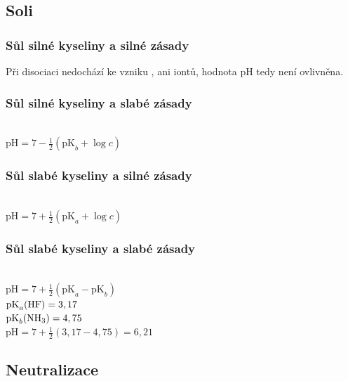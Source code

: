 \subsection{Soli}

\subsubsection{Sůl silné kyseliny a silné zásady}


Při disociaci nedochází ke vzniku , ani  iontů, hodnota pH tedy není ovlivněna.

\subsubsection{Sůl silné kyseliny a slabé zásady}
\\
$\textrm{pH} = 7 - \frac{1}{2}(\textrm{pK}_b + \log c)$ \\

\subsubsection{Sůl slabé kyseliny a silné zásady}
\\
$\textrm{pH} = 7 + \frac{1}{2}(\textrm{pK}_a + \log c)$ \\

\subsubsection{Sůl slabé kyseliny a slabé zásady}
\\
$\textrm{pH} = 7 + \frac{1}{2}(\textrm{pK}_a - \textrm{pK}_b)$\\
$\textrm{pK}_a (\ce{HF}) = 3,17$\\
$\textrm{pK}_b (\ce{NH3}) = 4,75$\\
$\textrm{pH} = 7 + \frac{1}{2}(3,17 - 4,75) = 6,21$\\

\newpage
\subsection{Neutralizace}


